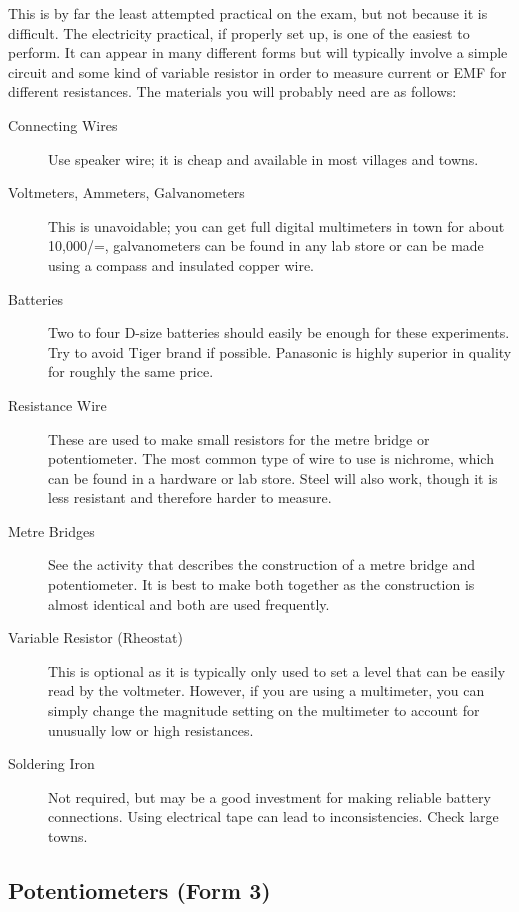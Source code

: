 This is by far the least attempted practical on the exam, but not because it is
difficult. The electricity practical, if properly set up, is one of the easiest to perform. It
can appear in many different forms but will typically involve a simple circuit and some
kind of variable resistor in order to measure current or EMF for different resistances. The
materials you will probably need are as follows:

\begin{description}
\item[Connecting Wires]{Use speaker wire; it is cheap and available in most villages
and towns.}
\item[Voltmeters, Ammeters, Galvanometers]{This is unavoidable; you can get full
digital multimeters in town for about 10,000/=, galvanometers can be found in
any lab store or can be made using a compass and insulated copper wire.}
\item[Batteries]{Two to four D-size batteries should easily be enough for these experiments. Try to avoid Tiger brand if possible. Panasonic is highly superior in quality for roughly the same price.}
\item[Resistance Wire]{These are used to make small resistors for
the metre bridge or potentiometer. The most common type of wire to use is
nichrome, which can be found in a hardware or lab store. Steel will also work, though it
is less resistant and therefore harder to measure.}
\item[Metre Bridges]{See the activity that describes the construction of a metre bridge
and potentiometer. It is best to make both together as the construction is almost
identical and both are used frequently.}
\item[Variable Resistor (Rheostat)]{This is optional as it is typically only used to set a
level that can be easily read by the voltmeter. However, if you are using a
multimeter, you can simply change the magnitude setting on the multimeter to
account for unusually low or high resistances.}
\item[Soldering Iron]{Not required, but may be a good investment for making reliable battery connections. Using electrical tape can lead to inconsistencies. Check large towns.}
\end{description}

\subsection{Potentiometers (Form 3)}


